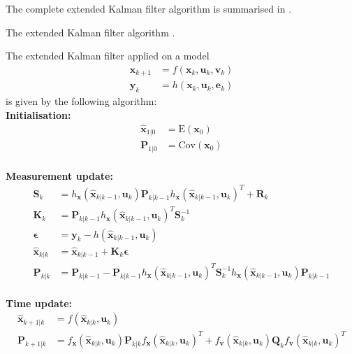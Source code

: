 The complete extended Kalman filter algorithm is summarised in .
\begin{algorithm}
\caption{The extended Kalman filter algorithm \citep{sensorfusion}.}
\label{alg:EKF}
  The extended Kalman filter applied on a model
    \begin{align*}
    \boldsymbol{x}_{k+1} &= f(\boldsymbol{x}_{k},\boldsymbol{u}_{k}, \boldsymbol{v}_{k})\\
    \boldsymbol{y}_{k} &= h(\boldsymbol{x}_{k},\boldsymbol{u}_{k},\boldsymbol{e}_{k})
    \end{align*} is given by the following algorithm:\\
    \textbf{Initialisation:}
    \begin{align*}
    \hat{\boldsymbol{x}}_{1|0} &= \text{E}(\boldsymbol{x}_{0})\\
    \boldsymbol{P}_{1|0} &= \text{Cov}(\boldsymbol{x}_{0})\\
    \end{align*}
     
    \textbf{Measurement update:}
    \begin{align*}
    \boldsymbol{S}_{k} &= h_{\boldsymbol{x}}(\hat{\boldsymbol{x}}_{k|k-1},\boldsymbol{u}_{k}) \boldsymbol{P}_{k|k-1} h_{\boldsymbol{x}}(\hat{\boldsymbol{x}}_{k|k-1},\boldsymbol{u}_{k})^{T} + \boldsymbol{R}_{k}\\
    \boldsymbol{K}_{k} &= \boldsymbol{P}_{k|k-1} h_{\boldsymbol{x}}(\hat{\boldsymbol{x}}_{k|k-1},\boldsymbol{u}_{k})^{T} \boldsymbol{S}_{k}^{-1}\\
    \boldsymbol{\epsilon} &= \boldsymbol{y}_{k} - h(\hat{\boldsymbol{x}}_{k|k-1},\boldsymbol{u}_{k})\\
    \hat{\boldsymbol{x}}_{k|k} &= \hat{\boldsymbol{x}}_{k|k-1} + \boldsymbol{K}_{k}\boldsymbol{\epsilon}\\
    \boldsymbol{P}_{k|k} &= \boldsymbol{P}_{k|k-1} - \boldsymbol{P}_{k|k-1} h_{\boldsymbol{x}}(\hat{\boldsymbol{x}}_{k|k-1},\boldsymbol{u}_{k})^{T} \boldsymbol{S}_{k}^{-1} h_{\boldsymbol{x}}(\hat{\boldsymbol{x}}_{k|k-1},\boldsymbol{u}_{k}) \boldsymbol{P}_{k|k-1}\\
    \end{align*}
    
   \textbf{Time update:}
    \begin{align*}
    \hat{\boldsymbol{x}}_{k+1|k} &= f(\hat{\boldsymbol{x}}_{k|k},\boldsymbol{u}_{k})\\
    \boldsymbol{P}_{k+1|k} &= f_{\boldsymbol{x}}(\hat{\boldsymbol{x}}_{k|k},\boldsymbol{u}_ {k})\boldsymbol{P}_{k|k} f_{\boldsymbol{x}}(\hat{\boldsymbol{x}}_{k|k},\boldsymbol{u}_{k})^{T} + f_{\boldsymbol{v}}(\hat{\boldsymbol{x}}_{k|k},\boldsymbol{u}_{k}) \boldsymbol{Q}_{k} f_{\boldsymbol{v}}(\hat{\boldsymbol{x}}_{k|k},\boldsymbol{u}_{k})^{T}
    \end{align*}    
\end{algorithm}


